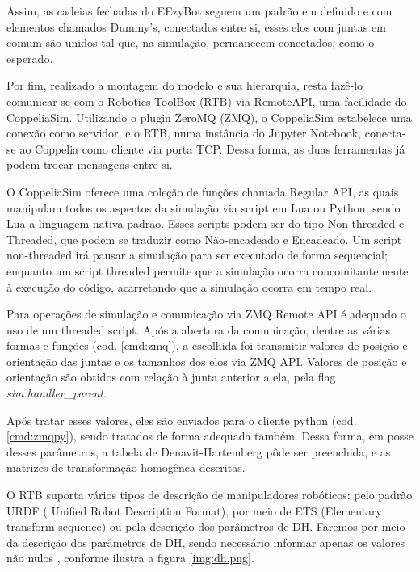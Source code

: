 
Assim, as cadeias fechadas do EEzyBot seguem um padrão em definido e com elementos chamados Dummy’s, conectados entre si, esses elos com juntas em comum são unidos tal que, na simulação, permanecem conectados, como o esperado.

Por fim, realizado a montagem do modelo e sua hierarquia, resta fazê-lo comunicar-se com o Robotics ToolBox (RTB) via RemoteAPI, uma facilidade do CoppeliaSim. Utilizando o plugin ZeroMQ (ZMQ), o CoppeliaSim estabelece uma conexão como servidor, e o RTB, numa instância do Jupyter Notebook, conecta-se ao Coppelia como cliente via porta TCP.	Dessa forma, as duas ferramentas já podem trocar mensagens entre si.

O CoppeliaSim oferece uma coleção de funções chamada Regular API, as quais manipulam todos os aspectos da simulação via script em Lua ou Python, sendo Lua a linguagem nativa padrão. Esses scripts podem ser do tipo Non-threaded e Threaded, que podem se traduzir como Não-encadeado e Encadeado. Um script non-threaded irá pausar a simulação para ser executado de forma sequencial; enquanto um script threaded permite que a simulação ocorra concomitantemente à execução do código, acarretando que a simulação ocorra em tempo real.

Para operações de simulação e comunicação via ZMQ Remote API é adequado o uso de um threaded script. Após a abertura da comunicação, dentre as várias formas e funções (cod. \ref{cmd:zmq}), a escolhida foi transmitir valores de posição e orientação das juntas e os tamanhos dos elos via ZMQ API.  Valores de posição e orientação são obtidos com relação à junta anterior a ela, pela flag \textit{sim.handler\_parent}.


Após tratar esses valores, eles são enviados para o cliente python (cod. \ref{cmd:zmqpy}), sendo tratados de forma adequada também. Dessa forma, em posse desses parâmetros, a tabela de Denavit-Hartemberg pôde ser preenchida, e as matrizes de transformação homogênea descritas. 


O RTB suporta vários tipos de descrição de manipuladores robóticos: pelo padrão URDF ( Unified Robot Description Format), por meio de ETS (Elementary transform sequence) ou pela descrição dos parâmetros de DH.  Faremos por meio da descrição dos parâmetros de DH, sendo necessário informar apenas os valores não nulos \cite{haviland2023dkt1}, conforme ilustra a figura \ref{img:dh.png}.

